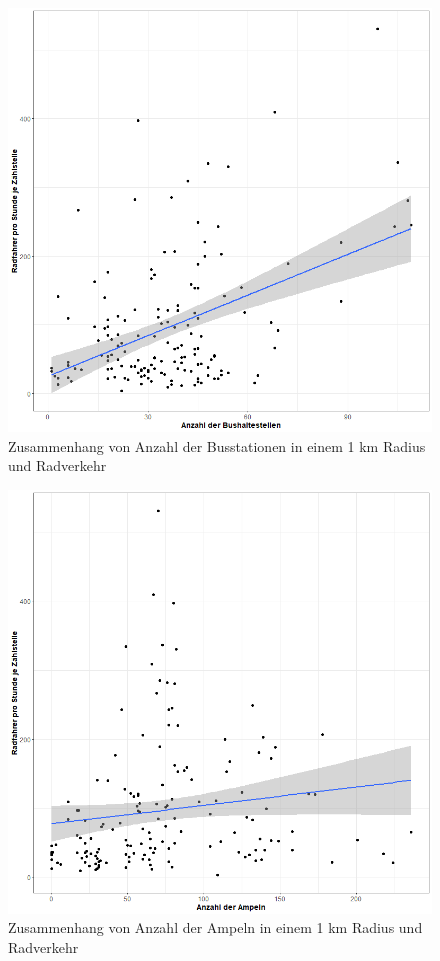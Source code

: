 \documentclass[a4paper,12pt]{thesis}
\begin{document}
\begin{figure}[!ht]
	\centering
	\includegraphics[width=\textwidth]{Plots/plot16.png}
	\caption{Zusammenhang von Anzahl der Busstationen in einem 1 km Radius und Radverkehr}
	\label{BusStops}
\end{figure}

\begin{figure}[!ht]
	\centering
	\includegraphics[width=\textwidth]{Plots/plot17.png}
	\caption{Zusammenhang von Anzahl der Ampeln in einem 1 km Radius und Radverkehr}
	\label{Signals}
\end{figure}
\end{document}
